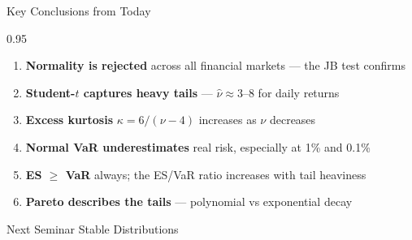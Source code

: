 \documentclass[9pt, aspectratio=169, t]{beamer}
\begin{document}
\begin{frame}{Key Conclusions from Today}
\begin{cminipage}{0.95\textwidth}
    \begin{enumerate}\setlength{\itemsep}{0pt}
        \item \textbf{Normality is rejected} across all financial markets --- the JB test confirms
        \item \textbf{Student-$t$ captures heavy tails} --- $\hat{\nu} \approx 3$--$8$ for daily returns
        \item \textbf{Excess kurtosis} $\kappa = 6/(\nu-4)$ increases as $\nu$ decreases
        \item \textbf{Normal VaR underestimates} real risk, especially at 1\% and 0.1\%
        \item \textbf{ES $\geq$ VaR} always; the ES/VaR ratio increases with tail heaviness
        \item \textbf{Pareto describes the tails} --- polynomial vs exponential decay
    \end{enumerate}

    \vspace{0.3cm}
    \begin{block}{Next Seminar}
        Stable Distributions
    \end{block}
\end{cminipage}
\end{frame}
\end{document}
